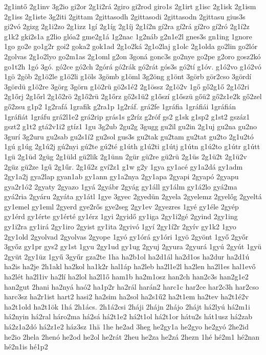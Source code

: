 {2g1intő
2g1inv
3g2io
gi2or
2g1i2rá
2giro
gi2rod
giro1s
2g1irt
g1isc
2g1isk
2g1ism
2g1iss
2g1iste
3g2iti
2gittam
2gittasodh
2gittasodi
2gittasodn
2gittasu
gius3s
gi2vó
2gizg
2g1i2zo
2g1izz
1gí
2g1íg
2g1íj
2g1í2n
gí2ra
gí2rá
gí2ro
gí2ró
2g1í2z
g1k2
gki2s1a
g2lio
glóa2
gme2g1á
1g2nac
1g2náb
g2n1e2l
gnes3s
gn1ing
1gnore
1go
go2e
go1g2r
goi2
goka2
gok1ad
2g1o2ká
2g1o2laj
g1olc
2g1olda
go2lin
go2lór
2golvas
2g1o2lyo
go2m1as
2g1oml
g2on
3goná
gonc3s
go2nye
go2pe
g2oro
gosz2kó
go1t2h
1gó
3gó.
gó2ce
gó2ch
2górá
gó2rák
gó2rát
gós3s
gó2tí
g1óv.
g1ó2vo
g1ó2vó
1gö
2göb
2g1ö2le
g1ö2li
g1öls
3gömb
g1öml
3g2öng
g1önt
3görb
gör2cso
3gördí
3gördü
g1ö2re
3görg
3görn
g1ö2rü
gö2s1é2
2g1össz
2g1ö2v
1gő
gő2g1ő
2g1ő2ri
2g1őrj
2g1őrl
2g1ő2rö
2g1ő2rü
2g1őrz
gő2s1ü2
g1őszí
g1őszü
gőü2
gő2z1e2k
gő2zel
gő2zsu
g1p2
1g2rafá
1grafik
g2ra1p
1g2ráf.
grá2fe
1gráfia
1gráfiái
1gráfián
1gráfiát
1gráfu
grá2l1e2
grá2rip
grás1s
g2ríz
g2róf
gs2
g1sk
g1sp2
g1st2
gszáz1
gszt2
g1t2
gtá2v1i2
gtíz1
1gu
3g2ub
2gu2g
3gugg
gu2il
gu2in
2g1uj
gu2na
gu2no
3gurí
3g2uru
gu2sab
gu2s1í2
gu2sol
gus3s
gu2tak
gu2tam
gu2tat
gu2to
2g1u2tó
1gú
g1úg
2g1ú2j
gú2nyi
gú2te
gú2té
g1úth
g1ú2ti
g1útj
g1útn
g1ú2to
g1útr
g1útt
1gü
2g1üd
2güg
2g1üld
gü2lik
2g1ünn
2gür
gü2re
gü2rü
2g1üs
2g1ü2t
2g1ü2v
2güz
gü2ze
1gű
2g1űr.
2g1ű2z
gví2z1
g1w
g2y
1gya
gy1acé
gy1a2dá
gy1adm
2gy1a2j
gya2lap
gyan1ab
gy1ann
gy1a2nya
2gy1apa
2gyapi
2gyapó
2gyapu
gya2r1ó2
2gyaty
2gyazo
1gyá
2gyábr
2gyág
gy1áll
gy1álm
gy1á2lo
gyá2ma
gyá2ria
2gyáru
2gyáta
gy1átl
1gye
3gyec
2gyedün
2gyela
2gyelemz
2gyelőg
2gyeltá
gy1emel
gy1eml
2gyerd
gye2rős
gye2seg
2gy1ev
2gyezres
1gyé
gy1éle
2gyép
gy1érd
gy1érte
gy1érté
gy1érz
1gyi
2gyidő
gy1iga
2gy1i2gé
2gyind
2gy1ing
gy1i2ra
gy1irá
2gy1iro
2gyist
gy1ita
2gyivó
1gyí
2gy1í2r
2gyív
gy1k2
1gyo
2gy1old
2gyolvad
2gyolvas
2gyope
1gyó
gy1órá
gy1óri
1gyö
2gyönt
1győ
2győr
3győz
gy1pr
gys2
gy1st
1gyu
2gy1ud
gy1ug
2gyuj
2gyura
2gyurá
1gyú
2gyút
1gyü
2gyüt
2gy1üz
1gyű
3gyűr
gza2te
1ha
ha2b1ol
ha2d1ál
ha2d1os
ha2dur
ha2d1ú
ha2is
ha2je
2h1akl
ha2kol
ha1k2r
hal1áp
ha2leb
ha2l1e2l
ha2len
ha2l1es
hal1evő
ha2lét
ha2l1iv
ha2lí
ha2lol
ha2l1ő
ham1b
ha2m1osz
han2ch
han2c3s
han2g1e2
han2gut
2hani
ha2nyá
haó2
ha1p2r
ha2rál
harán2
harc1c
har2ce
har2c3h
har2cso
harc3sz
ha2r1ist
hart2
hasi2
ha2sim
ha2sol
ha2s1ű2
ha2t1em
ha2tev
ha2t1é2v
ha2t1old
ha2t1ök
1há
2h1ács.
2h1á2csi
2háji
2hájn
2hájo
2hájt
há2lyú
há2m1i
há2nyin
há2ral
háro2ma
há2sá
há2t1e2
há2t1ol
há2t1or
hátu2s
hát1usz
há2zab
há2z1a2dó
há2z1e2
ház3sz
1hä
1he
he2ad
3heg
he2gy1a
he2gyo
he2gyó
2he2id
he2io
2hela
2henó
he2od
he2ol
he2rát
2heu
he2za
he2zá
2hezn
1hé
hé2m1
hé2nan
hé2n1is
hé1p2
}
